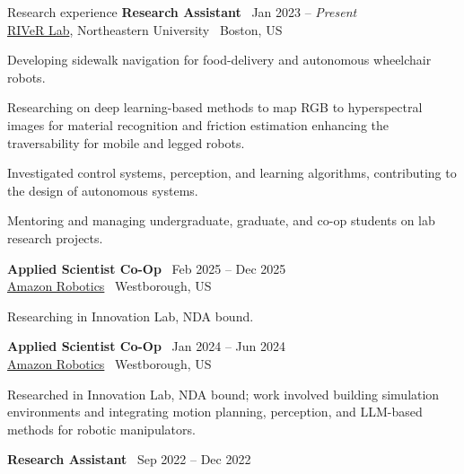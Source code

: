 \documentclass{resume}
\begin{document}
\begin{rSection}{Research experience}
{\bf Research Assistant} \hfill {\ Jan 2023 -- \textit{Present} }\\ 
{\href{https://robot.neu.edu/}{RIVeR Lab}, Northeastern University} \hfill {\ {Boston, US}}
\begin{cvitems}
    \item Developing sidewalk navigation for food-delivery and autonomous wheelchair robots.
    \item Researching on deep learning-based methods to map RGB to hyperspectral images for material recognition and friction estimation enhancing the traversability for mobile and legged robots.
    \item Investigated control systems, perception, and learning algorithms, contributing to the design of autonomous systems.
    \item Mentoring and managing undergraduate, graduate, and co-op students on lab research projects.
\end{cvitems}
{\bf Applied Scientist Co-Op} \hfill {\ Feb 2025 -- Dec 2025 }\\ 
{\href{https://www.aboutamazon.com/news/tag/robotics}{Amazon Robotics}} \hfill {\ {Westborough, US}}
\begin{cvitems}
    \item Researching in Innovation Lab, NDA bound.
\end{cvitems}
{\bf Applied Scientist Co-Op} \hfill {\ Jan 2024 -- Jun 2024 }\\ 
{\href{https://www.aboutamazon.com/news/tag/robotics}{Amazon Robotics}} \hfill {\ {Westborough, US}}
\begin{cvitems}
    \item Researched in Innovation Lab, NDA bound; work involved building simulation environments and integrating motion planning, perception, and LLM-based methods for robotic manipulators.
\end{cvitems}
{\bf Research Assistant} \hfill {\ Sep 2022 -- Dec 2022 }\\ 

\end{rSection}
\end{document}
